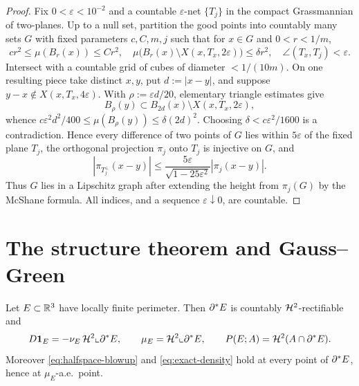 \begin{proof}
Fix $0<\varepsilon<10^{-2}$ and a countable $\varepsilon$-net $\{T_j\}$ in
the compact Grassmannian of two-planes.  Up to a null set, partition the good
points into countably many sets $G$ with fixed parameters $c,C,m,j$ such that
for $x\in G$ and $0<r<1/m$,
\begin{equation}\label{eq:rect-piece}
  cr^2\le\mu(B_r(x))\le Cr^2,\quad
  \mu\bigl(B_r(x)\setminus X(x,T_x,2\varepsilon)\bigr)\le\delta r^2,\quad
  \angle(T_x,T_j)<\varepsilon .
\end{equation}
Intersect with a countable grid of cubes of diameter $<1/(10m)$.  On one
resulting piece take distinct $x,y$, put $d:=|x-y|$, and suppose
$y-x\notin X(x,T_x,4\varepsilon)$.  With $\rho:=\varepsilon d/20$,
elementary triangle estimates give
\begin{equation}\label{eq:rect-inclusion}
  B_\rho(y)\subset B_{2d}(x)\setminus X(x,T_x,2\varepsilon),
\end{equation}
whence $c\varepsilon^2d^2/400\le\mu(B_\rho(y))\le\delta(2d)^2$.  Choosing
$\delta<c\varepsilon^2/1600$ is a contradiction.  Hence every difference of
two points of $G$ lies within $5\varepsilon$ of the fixed plane $T_j$, the
orthogonal projection $\pi_j$ onto $T_j$ is injective on $G$, and
\begin{equation}\label{eq:rect-lip}
  |\pi_{T_j^\perp}(x-y)|
  \le\frac{5\varepsilon}{\sqrt{1-25\varepsilon^2}}|\pi_j(x-y)| .
\end{equation}
Thus $G$ lies in a Lipschitz graph after extending the height from
$\pi_j(G)$ by the McShane formula.  All indices, and a sequence
$\varepsilon\downarrow0$, are countable.
\end{proof}

\section{The structure theorem and Gauss--Green}

\begin{theorem}\label{thm:degiorgi-structure}
Let $E\subset\mathbb R^3$ have locally finite perimeter.  Then $\partial^* E$ is countably
$\mathcal H^2$-rectifiable and
\begin{equation}\label{eq:degiorgi-structure}
  D\mathbf 1_{E}=-\nu_E\,\mathcal H^2\llcorner\partial^* E,
  \qquad
  \mu_E=\mathcal H^2\llcorner\partial^* E,
  \qquad
  P(E;A)=\mathcal H^2(A\cap\partial^* E).
\end{equation}
Moreover \eqref{eq:halfspace-blowup} and \eqref{eq:exact-density} hold at
every point of $\partial^* E$, hence at $\mu_E$-a.e.\ point.
\end{theorem}

